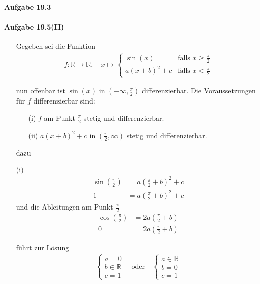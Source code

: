 \paragraph{Aufgabe 19.3}

\begin{enumerate}

\item[]

\end{enumerate}

\newpage

\paragraph{Aufgabe 19.5(H)}

\begin{enumerate}

\item[]

Gegeben sei die Funktion
\begin{align*}
f:\mathbb{R}\rightarrow\mathbb{R},
\hspace{1em}
x\mapsto
\left\{
\begin{array}{lcl}
\sin(x) & \mbox{falls }x\geq\frac{\pi}{2} \\
a(x+b)^2+c & \mbox{falls }x<\frac{\pi}{2}
\end{array}
\right.
\end{align*}

nun offenbar ist $\sin(x)$ in $(-\infty,\frac{\pi}{2})$ differenzierbar. Die Voraussetzungen für $f$ differenzierbar sind:
\begin{enumerate}
\item[(i)]$f$ am Punkt $\frac{\pi}{2}$ stetig und differenzierbar.
\item[(ii)]$a(x+b)^2+c$ in $(\frac{\pi}{2},\infty)$ stetig und differenzierbar.
\end{enumerate}

dazu
\item[(i)]
\begin{align*}
\sin(\frac{\pi}{2})&=a(\frac{\pi}{2}+b)^2+c \\
1&=a(\frac{\pi}{2}+b)^2+c
\end{align*}
und die Ableitungen am Punkt $\frac{\pi}{2}$
\begin{align*}
\cos(\frac{\pi}{2})&=2a(\frac{\pi}{2}+b) \\
0&=2a(\frac{\pi}{2}+b)
\end{align*}

führt zur Lösung
\begin{align*}
\left\{
\begin{array}{lcl}
a=0 \\
b\in\mathbb{R} \\
c=1
\end{array}
\right.
\hspace{1em}\mbox{oder}\hspace{1em}
\left\{
\begin{array}{lcl}
a\in\mathbb{R} \\
b=0 \\
c=1
\end{array}
\right.
\end{align*}


\end{enumerate}
